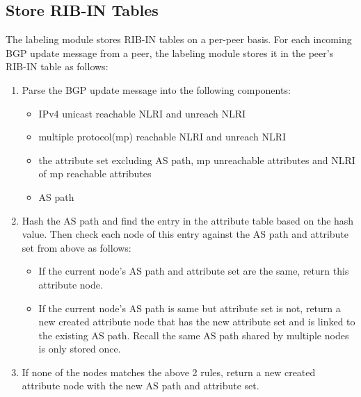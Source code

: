 \subsection{Store RIB-IN Tables}
\label{sec:labeling:storerib}
The labeling module stores RIB-IN tables on a per-peer basis. For each incoming BGP update message from a peer, the labeling module stores it in the peer's RIB-IN table as follows:
\begin{enumerate}
	\item{Parse the BGP update message into the following components:}
	\begin{itemize}
		\item{IPv4 unicast reachable NLRI and unreach NLRI}
		\item{multiple protocol(mp) reachable NLRI and unreach NLRI}
		\item{the attribute set excluding AS path, mp unreachable attributes and NLRI of mp reachable attributes}
		\item{AS path}
	\end{itemize}
	
	\item{Hash the AS path and find the entry in the attribute table based on the hash value. Then check each node of this entry against the AS path and attribute set from above as follows:}
	\begin{itemize}
		\item{If the current node's AS path and attribute set are the same, return this attribute node.}
		\item{If the current node's AS path is same but attribute set is not, return a new created attribute node that has the new attribute set and is linked to the existing AS path. Recall the same AS path shared by multiple nodes is only stored once.}
	\end{itemize}
	\item{If none of the nodes matches the above 2 rules, return a new created attribute node with the new AS path and attribute set.}
		

\end{enumerate}
